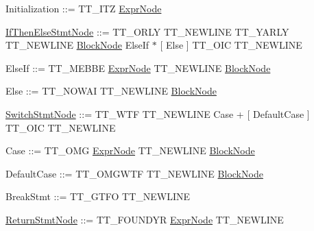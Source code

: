\begin{DoxyParagraph}{}
Initialization \-:\-:= {\ttfamily T\-T\-\_\-\-I\-T\-Z} \hyperlink{struct_expr_node}{Expr\-Node}
\end{DoxyParagraph}
\begin{DoxyParagraph}{}
\hyperlink{struct_if_then_else_stmt_node}{If\-Then\-Else\-Stmt\-Node} \-:\-:= {\ttfamily T\-T\-\_\-\-O\-R\-L\-Y} {\ttfamily T\-T\-\_\-\-N\-E\-W\-L\-I\-N\-E} {\ttfamily T\-T\-\_\-\-Y\-A\-R\-L\-Y} {\ttfamily T\-T\-\_\-\-N\-E\-W\-L\-I\-N\-E} \hyperlink{struct_block_node}{Block\-Node} Else\-If $\ast$ \mbox{[} Else \mbox{]} {\ttfamily T\-T\-\_\-\-O\-I\-C} {\ttfamily T\-T\-\_\-\-N\-E\-W\-L\-I\-N\-E} 
\end{DoxyParagraph}
\begin{DoxyParagraph}{}
Else\-If \-:\-:= {\ttfamily T\-T\-\_\-\-M\-E\-B\-B\-E} \hyperlink{struct_expr_node}{Expr\-Node} {\ttfamily T\-T\-\_\-\-N\-E\-W\-L\-I\-N\-E} \hyperlink{struct_block_node}{Block\-Node}
\end{DoxyParagraph}
\begin{DoxyParagraph}{}
Else \-:\-:= {\ttfamily T\-T\-\_\-\-N\-O\-W\-A\-I} {\ttfamily T\-T\-\_\-\-N\-E\-W\-L\-I\-N\-E} \hyperlink{struct_block_node}{Block\-Node}
\end{DoxyParagraph}
\begin{DoxyParagraph}{}
\hyperlink{struct_switch_stmt_node}{Switch\-Stmt\-Node} \-:\-:= {\ttfamily T\-T\-\_\-\-W\-T\-F} {\ttfamily T\-T\-\_\-\-N\-E\-W\-L\-I\-N\-E} Case + \mbox{[} Default\-Case \mbox{]} {\ttfamily T\-T\-\_\-\-O\-I\-C} {\ttfamily T\-T\-\_\-\-N\-E\-W\-L\-I\-N\-E} 
\end{DoxyParagraph}
\begin{DoxyParagraph}{}
Case \-:\-:= {\ttfamily T\-T\-\_\-\-O\-M\-G} \hyperlink{struct_expr_node}{Expr\-Node} {\ttfamily T\-T\-\_\-\-N\-E\-W\-L\-I\-N\-E} \hyperlink{struct_block_node}{Block\-Node}
\end{DoxyParagraph}
\begin{DoxyParagraph}{}
Default\-Case \-:\-:= {\ttfamily T\-T\-\_\-\-O\-M\-G\-W\-T\-F} {\ttfamily T\-T\-\_\-\-N\-E\-W\-L\-I\-N\-E} \hyperlink{struct_block_node}{Block\-Node}
\end{DoxyParagraph}
\begin{DoxyParagraph}{}
Break\-Stmt \-:\-:= {\ttfamily T\-T\-\_\-\-G\-T\-F\-O} {\ttfamily T\-T\-\_\-\-N\-E\-W\-L\-I\-N\-E} 
\end{DoxyParagraph}
\begin{DoxyParagraph}{}
\hyperlink{struct_return_stmt_node}{Return\-Stmt\-Node} \-:\-:= {\ttfamily T\-T\-\_\-\-F\-O\-U\-N\-D\-Y\-R} \hyperlink{struct_expr_node}{Expr\-Node} {\ttfamily T\-T\-\_\-\-N\-E\-W\-L\-I\-N\-E} 
\end{DoxyParagraph}
